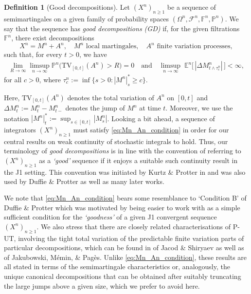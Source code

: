 \documentclass[11pt]{article}
\theoremstyle{definition}\newtheorem{example}[theorem]{Example}
\theoremstyle{definition}\newtheorem{counterexample}[theorem]{Counterexample}
\theoremstyle{definition}\newtheorem{remark}[theorem]{Remark}
\theoremstyle{definition}\newtheorem{defi}[theorem]{Definition}
\numberwithin{equation}{section}
\newcommand{\F}{\mathbb{F}}											%
\newcommand{\Pro}{\mathbb{P}}										%
\renewcommand{\|}{\; : \, \;}											%
\begin{document}
\begin{defi}[Good decompositions]\label{defn:GD} Let $(X^n)_{n\geq 1}$ be a sequence of semimartingales on a given family of probability spaces $(\Omega^n, \mathcal{F}^n, \F^n, \Pro^n)$. We say that the sequence has \emph{good decompositions (GD)} if, for the given filtrations $\F^n$, there exist decompositions
	\[
	X^n = M^n + A^n,\quad M^n  \text{ local martingales},\quad  A^n \text{ finite variation processes},
	\]
	such that, for every $t>0$, we have 
	\begin{align}\label{eq:Mn_An_condition}\tag{GD}
		\lim_{R\rightarrow \infty}  \limsup_{n\rightarrow\infty }  \mathbb{P}^n\bigl(\text{TV}_{[0,t]}(A^n)>R\bigr)=0 \quad \text{and}  \quad
		\limsup_{n\rightarrow \infty} \; \mathbb{E}^n\bigl[\, |\Delta M^n_{t \land \tau^n_c}|\, \bigr] <\infty,
	\end{align}
	for all $c>0$, where $\tau^n_c:= \operatorname{inf}\{s >0: |M^n|^*_s\ge c \}$. 
\end{defi}
Here, $\text{TV}_{[0,t]}(A^n)$ denotes the total variation of $A^n$ on $[0,t]$ and $\Delta M^n_t:= M^n_t - M^n_{t-}$ denotes the jump of $M^n$ at time $t$. Moreover, we use the notation $|M^n|^*_t:= \operatorname{sup}_{s\in[0,t]} |M^n_s|$. Looking a bit ahead, a sequence of integrators $(X^n)_{n\geq 1}$ must satisfy \eqref{eq:Mn_An_condition} in order for our central results on weak continuity of stochastic integrals to hold. Thus, our terminology of \emph{good decompositions} is in line with the convention of referring to $(X^n)_{n\geq 1}$ as a \emph{`good'} sequence if it enjoys a suitable such continuity result in the J1 setting. This convention was initiated by Kurtz \& Protter in \cite{graham, KP_Durham} and was also used by Duffie \& Protter \cite{duffie_protter} as well as many later works.

We note that \eqref{eq:Mn_An_condition} bears some resemblance to `Condition B' of Duffie \& Protter \cite[p.~6]{duffie_protter} which was motivated by being easier to work with as a simple sufficient condition for the \emph{`goodness'} of a given J1 convergent sequence $(X^n)_{n\geq1}$. We also stress that there are closely related characterisations of P-UT, involving the tight total variation of the predictable finite variation parts of particular decompositions, which can be found in \cite[Thms.~IV.6.15, IV.6.16, \& IV.6.21]{shiryaev} of Jacod \& Shiryaev as well as \cite[Lem.~3.1]{jakubowskimeminpages} of Jakubowski, M\'emin, \& Pag\`es. Unlike \eqref{eq:Mn_An_condition}, these results are all stated in terms of the semimartingale characteristics or, analogously, the unique canonical decompositions that can be obtained after suitably truncating the large jumps above a given size, which we prefer to avoid here.
\end{document}
